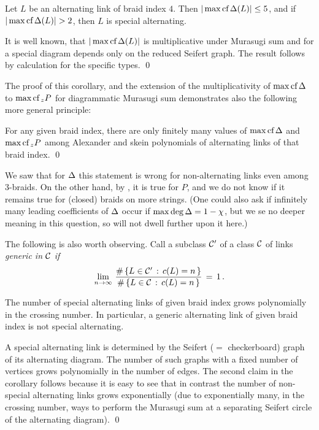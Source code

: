 \begin{corr}
Let $L$ be an alternating link of braid index $4$. Then
$|\max\text{\rm cf}\,\Delta(L)|\le 5$, and if $|\Mc\Dl(L)|>2$, then $L$ is
special alternating.
\end{corr}

\proof It is well known, that $|\max\text{\rm cf}\,\Delta(L)|$ is multiplicative
under Murasugi sum and for a special diagram depends only
on the reduced Seifert graph. The result follows by calculation
for the specific types. \qed

The proof of this corollary, and the extension of the multiplicativity
of $\max\text{\rm cf}\,\Delta$ to $\max\text{\rm cf}\,_zP$ for diagrammatic Murasugi sum \cite{MurPrz}
demonstrates also the following more general principle:

\begin{corr}\label{cSG}
For any given braid index, there are only finitely many values of
$\max\text{\rm cf}\,\Delta$ and $\max\text{\rm cf}\,_zP$ among Alexander and skein polynomials of
alternating links of that braid index. \qed
\end{corr}

We saw that for $\Delta$ this statement is wrong for non-alternating
links even among 3-braids. On the other hand, by \cite{3br},
it is true for $P$, and we do not know if it remains true for
(closed) braids on more strings. (One could also ask if
infinitely many leading coefficients of $\Delta$ occur if $\max\deg\Delta
=1-\chi$, but we se no deeper meaning in this question, so will
not dwell further upon it here.)

The following is also worth observing. Call a subclass
${\cal C}'$ of a class ${\cal C}$ of links \em{generic} in ${\cal C}$ if
\[
\lim_{n\to\infty}\,\frac{\#\,\{L\in {\cal C}'\,:\,c(L)=n\,\}}
{\#\,\{L\in {\cal C}\,:\,c(L)=n\,\}}\,=\,1\,.
\]

\begin{corr}
The number of special alternating links of given braid index
grows polynomially in the crossing number. In particular,
a generic alternating link of given braid index is not
special alternating.
\end{corr}

\proof A special alternating link is determined by the Seifert
($=$ checkerboard) graph of its alternating diagram. The number
of such graphs with a fixed number of vertices grows polynomially
in the number of edges. The second claim in the corollary
follows because it is easy to see that in contrast the number
of non-special alternating links grows exponentially (due to
exponentially many, in the crossing number, ways to perform the
Murasugi sum at a separating Seifert circle of the alternating
diagram). \qed

